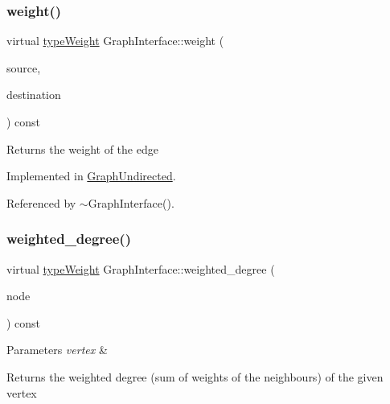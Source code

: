 \subsubsection{\texorpdfstring{weight()}{weight()}}
{\footnotesize\ttfamily virtual \hyperlink{edge_8h_a2e7ea3be891ac8b52f749ec73fee6dd2}{type\+Weight} Graph\+Interface\+::weight (\begin{DoxyParamCaption}\item[{const \hyperlink{edge_8h_a5fbd20c46956d479cb10afc9855223f6}{type\+Vertex} \&}]{source,  }\item[{const \hyperlink{edge_8h_a5fbd20c46956d479cb10afc9855223f6}{type\+Vertex} \&}]{destination }\end{DoxyParamCaption}) const\hspace{0.3cm}{\ttfamily [pure virtual]}}

\begin{DoxyReturn}{Returns}
the weight of the edge 
\end{DoxyReturn}


Implemented in \hyperlink{classGraphUndirected_ae40d431c92d8b4884c7915c44d42f356}{Graph\+Undirected}.



Referenced by $\sim$\+Graph\+Interface().

\mbox{\label{classGraphInterface_a3a4bd9e37e69a4488a48f781e36ea686}} 
\subsubsection{\texorpdfstring{weighted\+\_\+degree()}{weighted\_degree()}}
{\footnotesize\ttfamily virtual \hyperlink{edge_8h_a2e7ea3be891ac8b52f749ec73fee6dd2}{type\+Weight} Graph\+Interface\+::weighted\+\_\+degree (\begin{DoxyParamCaption}\item[{const \hyperlink{edge_8h_a5fbd20c46956d479cb10afc9855223f6}{type\+Vertex} \&}]{node }\end{DoxyParamCaption}) const\hspace{0.3cm}{\ttfamily [pure virtual]}}


\begin{DoxyParams}{Parameters}
{\em vertex} & \\
\hline
\end{DoxyParams}
\begin{DoxyReturn}{Returns}
the weighted degree (sum of weights of the neighbours) of the given vertex 
\end{DoxyReturn}


